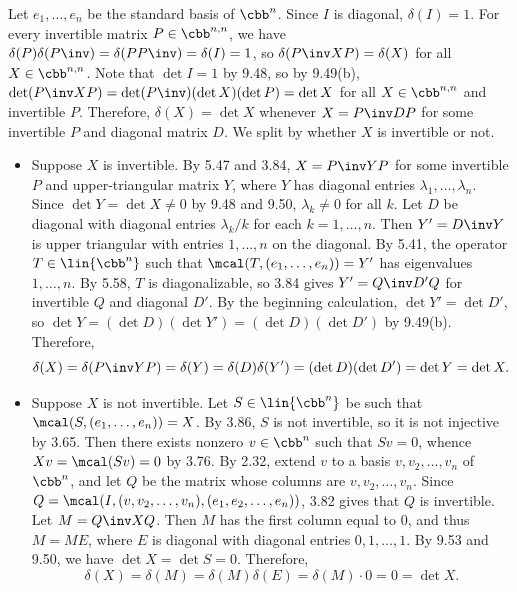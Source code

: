 \begin{sol}
    Let $e_1, \ldots, e_n$ be the standard basis of $\cbb^n$.
    Since $I$ is diagonal, $\delta(I) = 1$.
    For every invertible matrix $P \in \cbb^{n,n}$, we have $\delta(P)\delta(P\inv) = \delta(PP\inv) = \delta(I) = 1$, so $\delta(P\inv X P) = \delta(X)$ for all $X \in \cbb^{n,n}$.
    Note that $\det I = 1$ by 9.48, so by 9.49(b), $\det(P\inv X P) = \det(P\inv)(\det X)(\det P) = \det X$ for all $X \in \cbb^{n,n}$ and invertible $P$.
    Therefore, $\delta(X) = \det X$ whenever $X = P\inv D P$ for some invertible $P$ and diagonal matrix $D$.
    We split by whether $X$ is invertible or not.
    \begin{itemize}
        \item Suppose $X$ is invertible.
        By 5.47 and 3.84, $X = P\inv Y P$ for some invertible $P$ and upper-triangular matrix $Y$, where $Y$ has diagonal entries $\lambda_1, \ldots, \lambda_n$.
        Since $\det Y = \det X \neq 0$ by 9.48 and 9.50, $\lambda_k \neq 0$ for all $k$.
        Let $D$ be diagonal with diagonal entries $\lambda_k/k$ for each $k = 1, \ldots, n$.
        Then $Y' = D\inv Y$ is upper triangular with entries $1, \ldots, n$ on the diagonal.
        By 5.41, the operator $T \in \lin{\cbb^n}$ such that $\mcal(T, (e_1, \ldots, e_n)) = Y'$ has eigenvalues $1, \ldots, n$.
        By 5.58, $T$ is diagonalizable, so 3.84 gives $Y' = Q\inv D' Q$ for invertible $Q$ and diagonal $D'$.
        By the beginning calculation, $\det Y' = \det D'$, so $\det Y = (\det D)(\det Y') = (\det D)(\det D')$ by 9.49(b).
        Therefore,
        \[
            \delta(X) = \delta(P\inv Y P) = \delta(Y) = \delta(D) \delta(Y') = (\det D)(\det D') = \det Y = \det X.
        \]
        \item Suppose $X$ is not invertible.
        Let $S \in \lin{\cbb^n}$ be such that $\mcal(S, (e_1, \ldots, e_n)) = X$.
        By 3.86, $S$ is not invertible, so it is not injective by 3.65.
        Then there exists nonzero $v \in \cbb^n$ such that $S v = 0$, whence $X v = \mcal(S v) = 0$ by 3.76.
        By 2.32, extend $v$ to a basis $v, v_2, \ldots, v_n$ of $\cbb^n$, and let $Q$ be the matrix whose columns are $v, v_2, \ldots, v_n$.
        Since $Q = \mcal(I, (v, v_2, \ldots, v_n), (e_1, e_2, \ldots, e_n))$, 3.82 gives that $Q$ is invertible.
        Let $M = Q\inv X Q$.
        Then $M$ has the first column equal to $0$, and thus $M = M E$, where $E$ is diagonal with diagonal entries $0, 1, \ldots, 1$.
        By 9.53 and 9.50, we have $\det X = \det S = 0$.
        Therefore,
        \[
            \delta(X) = \delta(M) = \delta(M)\delta(E) = \delta(M) \cdot 0 = 0 = \det X.
        \]
    \end{itemize}
\end{sol}